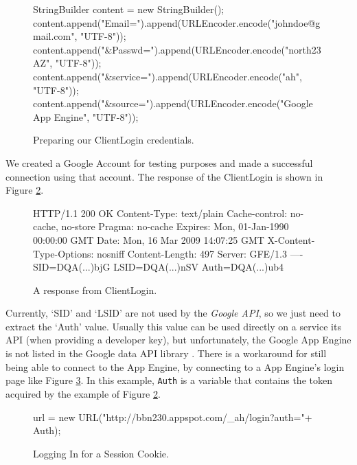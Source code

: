 \begin{figure}[ht] %
\begin{center}
\begin{code}
StringBuilder content = new StringBuilder();
content.append("Email=").append(URLEncoder.encode("johndoe@gmail.com", 
  "UTF-8"));
content.append("&Passwd=").append(URLEncoder.encode("north23AZ", "UTF-8"));
content.append("&service=").append(URLEncoder.encode("ah", "UTF-8"));
content.append("&source=").append(URLEncoder.encode("Google App Engine", 
  "UTF-8"));
\end{code}
\caption{Preparing our ClientLogin credentials.\label{clientimpl-clientlogin}}
\end{center}
\end{figure}

We created a Google Account for testing purposes and made a successful connection
using that account. The response of the ClientLogin is shown in Figure
\ref{clientimpl-clientlogin-response}.

\begin{figure}[ht] %
\begin{center}
\begin{code}
HTTP/1.1 200 OK
Content-Type: text/plain
Cache-control: no-cache, no-store
Pragma: no-cache
Expires: Mon, 01-Jan-1990 00:00:00 GMT
Date: Mon, 16 Mar 2009 14:07:25 GMT
X-Content-Type-Options: nosniff
Content-Length: 497
Server: GFE/1.3
----
SID=DQA(...)bjG
LSID=DQA(...)nSV
Auth=DQA(...)ub4
\end{code}
\caption{A response from ClientLogin.\label{clientimpl-clientlogin-response}}
\end{center}
\end{figure}

Currently, `SID' and `LSID' are not used by the \emph{Google API}, so we just
need to extract the `Auth' value. Usually this value can be used directly on a
service its API (when providing a developer key), but unfortunately, the Google
App Engine is not listed in the Google data API library \cite{service-api}.
There is a workaround for still being able to connect to the App Engine, by
connecting to a App Engine's login page like Figure \ref{clientimpl-aelogin}.
In this example, \texttt{Auth} is a variable that contains the token acquired
by the example of Figure \ref{clientimpl-clientlogin-response}. 

\begin{figure}[ht] %
\begin{center}
\begin{code}
url = new URL("http://bbn230.appspot.com/_ah/login?auth="+ Auth);
\end{code}
\caption{Logging In for a Session Cookie.\label{clientimpl-aelogin}}
\end{center}
\end{figure}

